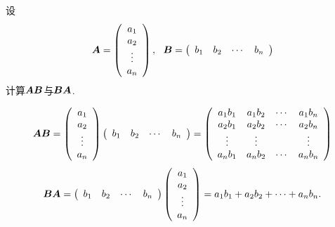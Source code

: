 \begin{frame}

\begin{li}
  设
  $$
  \boldsymbol{A} = \left(
    \begin{array}{c}
      a_1\\
      a_2\\
      \vdots\\
      a_n
    \end{array}
  \right), ~~
  \boldsymbol{B} = \left(
    \begin{array}{cccc}
      b_1 & b_2 & \cdots & b_n
    \end{array}
  \right)
  $$
  计算$\boldsymbol{A}\boldsymbol{B}$与$\boldsymbol{B}\boldsymbol{A}$.
\end{li} \pause 
\begin{jie}
  $$
  \boldsymbol{A}\boldsymbol{B} = \left(
    \begin{array}{c}
      a_1\\
      a_2\\
      \vdots\\
      a_n
    \end{array}
  \right)\left(
    \begin{array}{cccc}
      b_1 & b_2 & \cdots & b_n
    \end{array}
  \right) 
  = \left(
    \begin{array}{cccc}
      a_1b_1 & a_1b_2 & \cdots & a_1b_n\\
      a_2b_1 & a_2b_2 & \cdots & a_2b_n\\
      \vdots & \vdots & & \vdots\\
      a_nb_1 & a_nb_2 & \cdots & a_nb_n
    \end{array}
  \right)
  $$  \pause 
  $$
  \boldsymbol{B}\boldsymbol{A} = \left(
    \begin{array}{cccc}
      b_1 & b_2 & \cdots & b_n
    \end{array}
  \right)\left(
    \begin{array}{c}
      a_1\\
      a_2\\
      \vdots\\
      a_n
    \end{array}
  \right)  
  = a_1b_1+a_2b_2+\cdots+a_nb_n.
  $$
\end{jie}
\end{frame}

